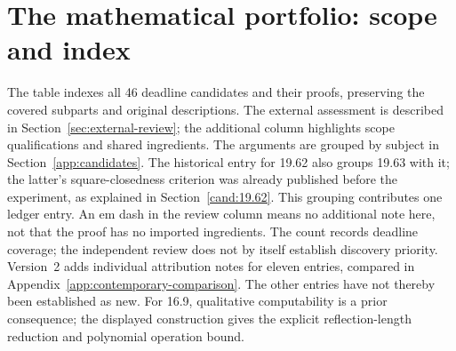 \section{The mathematical portfolio: scope and index}
\label{app:inventory}
The table indexes all 46 deadline candidates and their proofs, preserving
the covered subparts and original descriptions. The external assessment
is described in Section~\ref{sec:external-review}; the additional column
highlights scope qualifications and shared ingredients. The arguments
are grouped by subject in Section~\ref{app:candidates}. The historical entry for 19.62
also groups 19.63 with it; the latter's square-closedness criterion was
already published before the experiment, as explained in
Section~\ref{cand:19.62}. This grouping contributes one ledger entry.
An em dash in the review column means no additional note here, not that
the proof has no imported ingredients. The count records deadline coverage;
the independent review does not by itself establish discovery priority.
Version~2 adds individual attribution notes for eleven entries, compared
in Appendix~\ref{app:contemporary-comparison}. The other entries have not
thereby been established as new. For 16.9, qualitative computability is
a prior consequence; the displayed construction gives the explicit
reflection-length reduction and polynomial operation bound.


